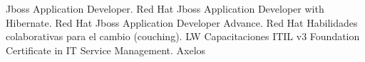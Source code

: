 %
%
%



\begin{scholarship}
					{Jboss Application Developer. Red Hat}
									{Jboss Application Developer with Hibernate. Red Hat}
									{Jboss Application Developer Advance. Red Hat}
									{Habilidades colaborativas para el cambio (couching). LW Capacitaciones}
									{ITIL v3 Foundation Certificate in IT Service Management. Axelos}
\end{scholarship}
